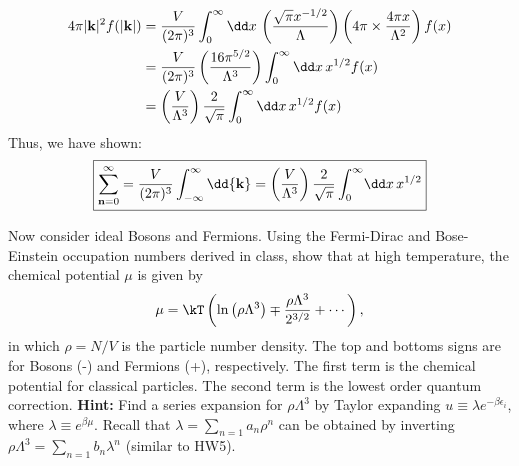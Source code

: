 {\begin{align*}
    4 \pi |{\bf k}|^2 f(|{\bf k}|) 
 &= \frac{V}{(2\pi)^3} \int_0^\infty \dd x \, 
    \left( \frac{\sqrt{\pi} x^{-1/2}}{\Lambda} \right)
    \left( 4 \pi \times \frac{4 \pi x}{\Lambda^2} \right) f(x) \\
 &= \frac{V}{(2\pi)^3} \left( \frac{16 \pi^{5/2}}{\Lambda^3} \right) 
    \int_0^\infty \dd x \, x^{1/2} f(x) \\
 &= \left( \frac{V}{\Lambda^3} \right) \frac{2}{\sqrt{\pi}}
    \int_0^\infty \dd x \, x^{1/2} f(x)
\end{align*}
Thus, we have shown:
\[ \boxed{ \sum_{{\bf n} = 0}^\infty 
         = \frac{V}{(2\pi)^3} 
           \int_{-\infty}^{\infty}\dd{\bf k} 
         = \left(\frac{V}{\Lambda^3}\right) \frac{2}{\sqrt\pi} 
           \int_0^\infty \!\dd x\, x^{1/2} } \]
}


\smallskip \subp
Now consider ideal Bosons and Fermions.
Using the Fermi-Dirac and Bose-Einstein occupation
numbers derived in class,
show that at high temperature, 
the chemical potential $\mu$ is given by
\[
\mu = \kT \left( \ln\left(\rho \Lambda^3\right) \mp
  \frac{\rho \Lambda^3}{2^{3/2}} +
  \cdots \right) ,
\]
in which $\rho = N/V$ is the particle number density.
The top and bottoms signs are for Bosons (-) 
and Fermions (+), respectively.
The first term is the chemical potential for classical particles.
The second term is the lowest order quantum correction. 
{\bf Hint:} Find a series expansion for 
$\rho \Lambda^3$ by Taylor expanding 
$u \equiv \lambda e^{-\beta \epsilon_i}$,
where $\lambda \equiv e^{\beta \mu}$.
Recall that $\lambda = \sum_{n=1} a_n \rho^n$ 
can be obtained by inverting 
$\rho \Lambda^3 = \sum_{n=1} b_n \lambda^n$
(similar to HW5). 
